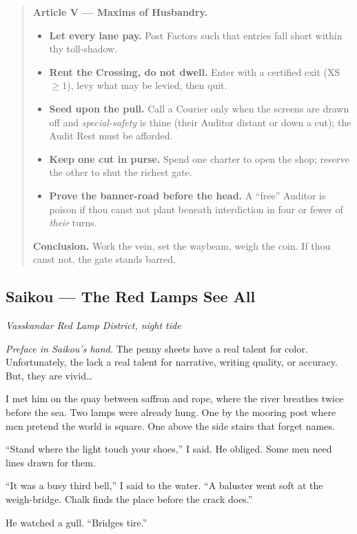 \documentclass[11pt]{article}
\begin{document}
\begin{quote}
\textbf{Article V --- Maxims of Husbandry.}
\begin{itemize}\itemsep0.25em
  \item \textbf{Let every lane pay.} Post Factors such that entries fall short within thy toll-shadow.
  \item \textbf{Rent the Crossing, do not dwell.} Enter with a certified exit (XS $\ge 1$), levy what may be levied, then quit.
  \item \textbf{Seed upon the pull.} Call a Courier only when the screens are drawn off and \emph{special-safety} is thine (their Auditor distant or down a cut); the Audit Rest must be afforded.
  \item \textbf{Keep one cut in purse.} Spend one charter to open the shop; reserve the other to shut the richest gate.
  \item \textbf{Prove the banner-road before the head.} A ``free'' Auditor is poison if thou canst not plant beneath interdiction in four or fewer of \emph{their} turns.
\end{itemize}

\medskip
\textbf{Conclusion.} Work the vein, set the waybeam, weigh the coin. If thou canst not, the gate stands barred.
\end{quote}

\clearpage

\subsection{Saikou --- The Red Lamps See All}

\noindent\textit{Vasskandar Red Lamp District, night tide}

\medskip
\noindent\textit{Preface in Saikou's hand.} The penny sheets have a real talent for color. Unfortunately, the lack a real talent for narrative, writing quality, or accuracy. But, they are vivid\dots

\medskip
I met him on the quay between saffron and rope, where the river breathes twice before the sea. Two lamps were already hung. One by the mooring post where men pretend the world is square. One above the side stairs that forget names.

``Stand where the light touch your shoes,'' I said. He obliged. Some men need lines drawn for them.

``It was a busy third bell,'' I said to the water. ``A baluster went soft at the weigh-bridge. Chalk finds the place before the crack does.''

He watched a gull. ``Bridges tire.''
\end{document}
